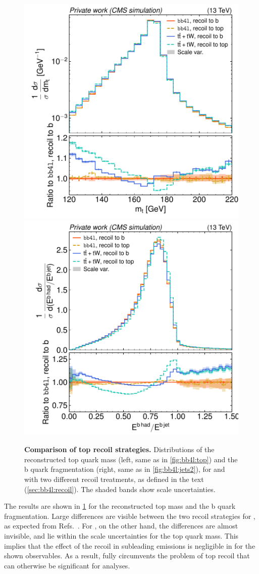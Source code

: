 \begin{figure}[tp]
    \centering
    \includegraphics[width=0.49 \textwidth]{figures/bb4l/recoil/MC_TTBAR_DILEP_SPINDENSITY_anytop_mass.pdf}
    \hfill
    \includegraphics[width=0.49 \textwidth]{figures/bb4l/recoil/MC_HFJETS_efracB.pdf}
    \caption{\textbf{Comparison of top recoil strategies.} Distributions of the reconstructed top quark mass (left, same as in \cref{fig:bb4l:top}) and the b quark fragmentation (right, same as in \cref{fig:bb4l:jets2}), for \bbfourl and \tttWsum with two different recoil treatments, as defined in the text (\cref{sec:bb4l:recoil}). The shaded bands show scale uncertainties.}
    \label{fig:bb4l:recoil}
\end{figure}

The results are shown in \cref{fig:bb4l:recoil} for the reconstructed top mass and the b quark fragmentation. Large differences are visible between the two recoil strategies for \tttWsum, as expected from Refs.~\cite{Brooks:2019xso,ATLAS:2022jbw}. For \bbfourl, on the other hand, the differences are almost invisible, and lie within the scale uncertainties for the top quark mass. This implies that the effect of the recoil in subleading emissions is negligible in \bbfourl for the shown observables. As a result, \bbfourl fully circumvents the problem of top recoil that can otherwise be significant for \ttbar analyses.

